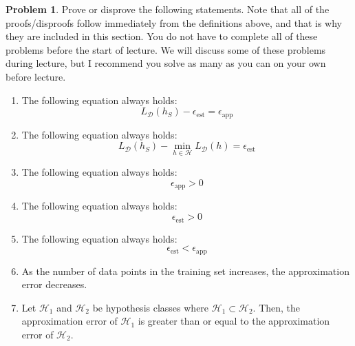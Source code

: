 \documentclass[10pt]{article}
\theoremstyle{definition}
\newtheorem{problem}{Problem}
\newcommand{\epsapp}{\epsilon_{\text{app}}}
\newcommand{\epsest}{\epsilon_{\text{est}}}
\begin{document}
\begin{problem}
    Prove or disprove the following statements.
    Note that all of the proofs/disproofs follow immediately from the definitions above, and that is why they are included in this section.
    You do not have to complete all of these problems before the start of lecture.
    We will discuss some of these problems during lecture,
    but I recommend you solve as many as you can on your own before lecture.

    \begin{enumerate}
        \item
            The following equation always holds:
            \begin{equation}
                L_\mathcal D(h_S) - \epsest = \epsapp
            \end{equation}
            \vspace{2.25in}
        \item
            The following equation always holds:
            \begin{equation}
                L_\mathcal D(h_S) - \min_{h\in\mathcal H} L_\mathcal D(h) = \epsest
            \end{equation}
            \vspace{2.25in}
        \item
            The following equation always holds:
            \begin{equation}
                \epsapp>0
            \end{equation}
            \vspace{2.75in}
        \item
            The following equation always holds:
            \begin{equation}
                \epsest>0
            \end{equation}
            \vspace{2.75in}
        \item
            The following equation always holds:
            \begin{equation}
                \epsest<\epsapp
            \end{equation}
            \vspace{2.75in}
        \item
            As the number of data points in the training set increases,
            the approximation error decreases.
            \vspace{2.75in}
        \item
            Let $\mathcal H_1$ and $\mathcal H_2$ be hypothesis classes where $\mathcal H_1 \subset \mathcal H_2$.
            Then, the approximation error of $\mathcal H_1$ is greater than or equal to the approximation error of $\mathcal H_2$.
            \vspace{2.75in}


\end{enumerate}
\end{problem}
\end{document}
